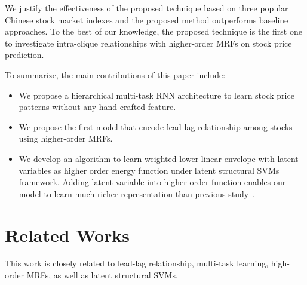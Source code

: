 \documentclass[sigconf]{acmart}
\renewcommand{\citename}{\citet}
\renewcommand{\cite}{\citep}
\begin{document}
We justify the effectiveness of the proposed technique based on
three popular Chinese stock market indexes and the proposed
method outperforms baseline approaches. To the best of our
knowledge, the proposed technique is the first one to investigate
intra-clique relationships with higher-order MRFs on stock price
prediction.
  

To summarize, the main contributions of this paper include: 
\begin{itemize}
\item  We propose a hierarchical multi-task RNN architecture to learn stock price
patterns without any hand-crafted feature.
\item We propose the first model that encode lead-lag relationship among stocks using
higher-order MRFs. 
\item We develop an algorithm to learn weighted lower linear envelope with latent variables as higher order energy function under latent structural SVMs framework. Adding latent variable into higher order function
enables our model to learn much richer representation than
previous study~\cite{gouldlearning}.
\end{itemize}

\section{Related Works}
\label{sec:background}
This work is closely related to lead-lag relationship, multi-task learning, high-order MRFs, as well as latent structural SVMs.
\end{document}
